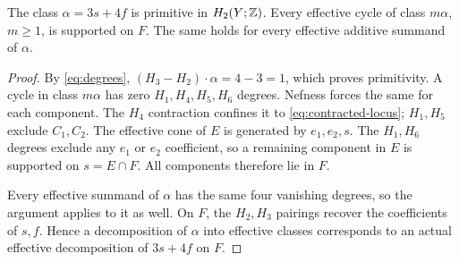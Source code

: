 \begin{proposition}\label{prop:support}
The class $\alpha=3s+4f$ is primitive in $H_2(Y;\mathbb Z)$.
Every effective cycle of class $m\alpha$, $m\ge1$, is supported on
$F$. The same holds for every effective additive summand of $\alpha$.
\end{proposition}
\begin{proof}
By \eqref{eq:degrees}, $(H_3-H_2)\cdot\alpha=4-3=1$,
which proves primitivity. A cycle in class $m\alpha$ has zero
$H_1,H_4,H_5,H_6$ degrees. Nefness forces the same for each
component. The $H_4$ contraction confines it to
\eqref{eq:contracted-locus}; $H_1,H_5$ exclude $C_1,C_2$.
The effective cone of $E$ is generated by $e_1,e_2,s$.
The $H_1,H_6$ degrees exclude any $e_1$ or $e_2$ coefficient,
so a remaining component in $E$ is supported on $s=E\cap F$.
All components therefore lie in $F$.

Every effective summand of $\alpha$ has the same four vanishing
degrees, so the argument applies to it as well. On $F$, the
$H_2,H_3$ pairings recover the coefficients of $s,f$. Hence a
decomposition of $\alpha$ into effective classes corresponds to
an actual effective decomposition of $3s+4f$ on $F$.
\end{proof}
